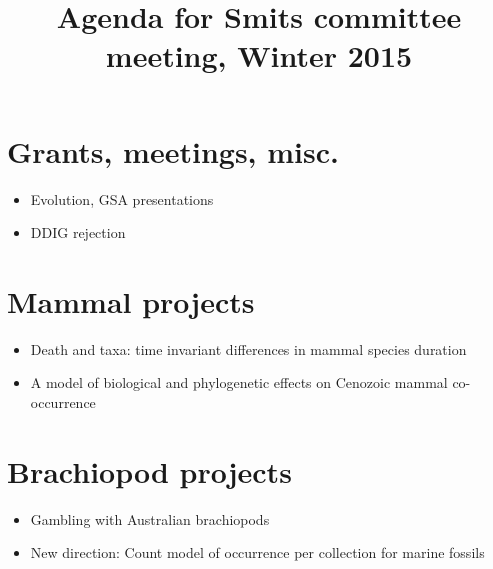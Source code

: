 \documentclass{article}
\title{Agenda for Smits committee meeting, Winter 2015}
\begin{document}
\maketitle

\section{Grants, meetings, misc.}
\begin{itemize}
  \item Evolution, GSA presentations
  \item DDIG rejection
\end{itemize}

\section{Mammal projects}
\begin{itemize}
  \item Death and taxa: time invariant differences in mammal species duration
  \item A model of biological and phylogenetic effects on Cenozoic mammal co-occurrence
\end{itemize}

\section{Brachiopod projects}
\begin{itemize}
  \item Gambling with Australian brachiopods
  \item New direction: Count model of occurrence per collection for marine fossils
\end{itemize}
\end{document}
